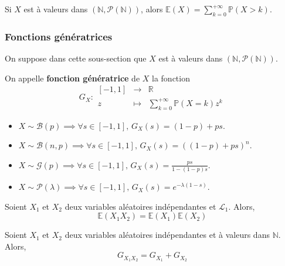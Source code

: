 
	\begin{proposition}
		Si $X$ est à valeurs dans $(\mathbb{N}, \mathcal{P}(\mathbb{N}))$, alors $\mathbb{E}(X) = \sum_{k=0}^{+\infty} \mathbb{P}(X > k)$.
	\end{proposition}

	\subsubsection{Fonctions génératrices}

	On suppose dans cette sous-section que $X$ est à valeurs dans $(\mathbb{N}, \mathcal{P}(\mathbb{N}))$.


	\begin{definition}
		On appelle \textbf{fonction génératrice} de $X$ la fonction
		\[
			G_X :
			\begin{array}{ccc}
				[-1,1] &\rightarrow& \mathbb{R} \\
				z &\mapsto& \sum_{k=0}^{+\infty} \mathbb{P}(X=k) z^k
			\end{array}
		\]
	\end{definition}

	\begin{example}
		\begin{itemize}
			\item $X \sim \mathcal{B}(p) \implies \forall s \in [-1,1], \, G_X(s) = (1-p) + ps$.
			\item $X \sim \mathcal{B}(n, p) \implies \forall s \in [-1,1], \, G_X(s) = ((1-p) + ps)^n$.
			\item $X \sim \mathcal{G}(p) \implies \forall s \in [-1,1], \, G_X(s) = \frac{ps}{1-(1-p)s}$.
			\item $X \sim \mathcal{P}(\lambda) \implies \forall s \in [-1,1], \, G_X(s) = e^{-\lambda (1-s)}$.
		\end{itemize}
	\end{example}

	\begin{theorem}
		Soient $X_1$ et $X_2$ deux variables aléatoires indépendantes et $\mathcal{L}_1$. Alors,
		\[ \mathbb{E}(X_1 X_2) = \mathbb{E}(X_1) \mathbb{E}(X_2) \]
	\end{theorem}

	\begin{corollary}
		Soient $X_1$ et $X_2$ deux variables aléatoires indépendantes et à valeurs dans $\mathbb{N}$. Alors,
		\[ G_{X_1 X_2} = G_{X_1} + G_{X_2} \]
	\end{corollary}

